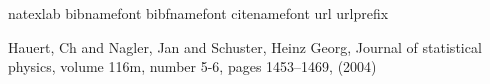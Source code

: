 \documentclass[aps,pra,twocolumn,groupedaddress,showpacs]{revtex4}
\begin{document}
\begin{thebibliography}{10}
\expandafter\ifx\csname natexlab\endcsname\relax\def\natexlab#1{#1}\fi
\expandafter\ifx\csname bibnamefont\endcsname\relax
  \def\bibnamefont#1{#1}\fi
\expandafter\ifx\csname bibfnamefont\endcsname\relax
  \def\bibfnamefont#1{#1}\fi
\expandafter\ifx\csname citenamefont\endcsname\relax
  \def\citenamefont#1{#1}\fi
\expandafter\ifx\csname url\endcsname\relax
  \def\url#1{\texttt{#1}}\fi
\expandafter\ifx\csname urlprefix\endcsname\relax\def\urlprefix{URL }\fi
\providecommand{\bibinfo}[2]{#2}
\providecommand{\eprint}[2][]{\url{#2}}



	Hauert, Ch and Nagler, Jan and Schuster, Heinz Georg, Journal of statistical physics, volume 116m,  number 5-6, pages 1453--1469, (2004)



\end{thebibliography}
\end{document}
